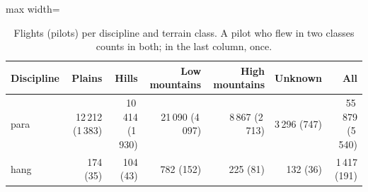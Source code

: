 \begin{table}
\centering
\small
\renewcommand{\arraystretch}{1.15}\setlength{\tabcolsep}{4pt}
\begin{adjustbox}{max width=\textwidth}
\begin{tabular}{lrrrrrr}
\toprule
Discipline & Plains & Hills & Low mountains & High mountains & Unknown & All \\
\midrule
para & 12\,212 (1\,383) & 10\,414 (1\,930) & 21\,090 (4\,097) & 8\,867 (2\,713) & 3\,296 (747) & 55\,879 (5\,540) \\
hang & 174 (35) & 104 (43) & 782 (152) & 225 (81) & 132 (36) & 1\,417 (191) \\
\bottomrule
\end{tabular}
\end{adjustbox}
\caption{Flights (pilots) per discipline and terrain class. A pilot who flew in two classes counts in both; in the last column, once.}\label{tab:counts}
\end{table}
